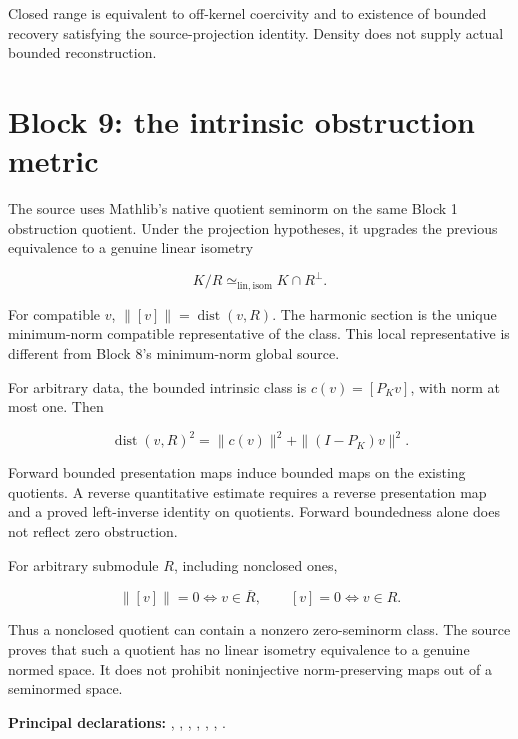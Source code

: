 \documentclass[11pt]{article}
\begin{document}
Closed range is equivalent to off-kernel coercivity and to existence of
bounded recovery satisfying the source-projection identity. Density does
not supply actual bounded reconstruction.

\hypertarget{block-9-the-intrinsic-obstruction-metric}{%
\section{Block 9: the intrinsic obstruction
metric}\label{block-9-the-intrinsic-obstruction-metric}}

The source uses Mathlib's native quotient seminorm on the same Block 1
obstruction quotient. Under the projection hypotheses, it upgrades the
previous equivalence to a genuine linear isometry

\[
K/R\simeq_{\mathrm{lin,isom}}K\cap R^\perp.
\]

For compatible \(v\), \(\|[v]\|=\operatorname{dist}(v,R)\). The harmonic
section is the unique minimum-norm compatible representative of the
class. This local representative is different from Block 8's
minimum-norm global source.

For arbitrary data, the bounded intrinsic class is \(c(v)=[P_Kv]\), with
norm at most one. Then

\[
\operatorname{dist}(v,R)^2=\|c(v)\|^2+\|(I-P_K)v\|^2.
\]

Forward bounded presentation maps induce bounded maps on the existing
quotients. A reverse quantitative estimate requires a reverse
presentation map and a proved left-inverse identity on quotients.
Forward boundedness alone does not reflect zero obstruction.

For arbitrary submodule \(R\), including nonclosed ones,

\[
\|[v]\|=0\iff v\in\overline R,\qquad [v]=0\iff v\in R.
\]

Thus a nonclosed quotient can contain a nonzero zero-seminorm class. The
source proves that such a quotient has no linear isometry equivalence to
a genuine normed space. It does not prohibit noninjective
norm-preserving maps out of a seminormed space.

\textbf{Principal declarations:}
\texttt{},
\texttt{},
\texttt{},
\texttt{},
\texttt{},
\texttt{},
\texttt{}.
\end{document}
